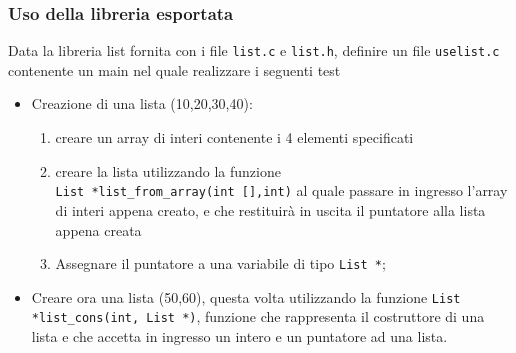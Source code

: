 \documentclass{beamer}
\begin{document}

\begin{frame}[fragile]
\frametitle{Uso della libreria esportata}
Data la libreria list fornita con i file \texttt{list.c} e \texttt{list.h}, definire un file \texttt{uselist.c} contenente un main nel quale realizzare i seguenti test
\begin{itemize}
 \item Creazione di una lista (10,20,30,40):
\begin{enumerate}
 \item creare un array di interi contenente i 4 elementi specificati
 \item creare la lista utilizzando la funzione \\ \texttt{List *list\_from\_array(int [],int)} al quale passare in ingresso l'array di interi appena creato, e che restituirà in uscita il puntatore alla lista appena creata
 \item Assegnare il puntatore a una variabile di tipo \texttt{List *};
\end{enumerate}
 \item Creare ora una lista (50,60), questa volta utilizzando la funzione \texttt{List *list\_cons(int, List *)}, funzione che rappresenta il costruttore di una lista e che accetta in ingresso un intero e un puntatore ad una lista.
\end{itemize}
\end{frame}
\end{document}
